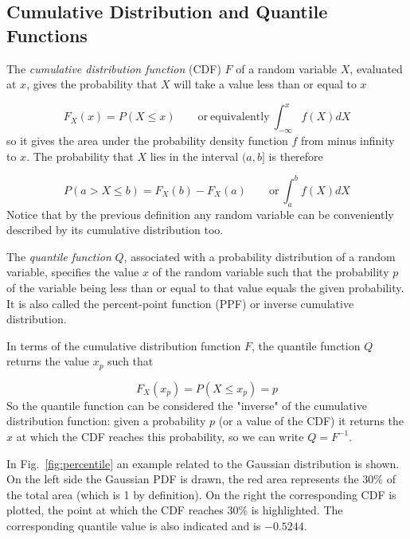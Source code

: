 \subsection{Cumulative Distribution and Quantile Functions}
\label{sec:quantile-function}

The \emph{cumulative distribution function} (CDF) $F$ of a random variable $X$, evaluated at $x$, gives the probability that $X$ will take a value less than or equal to $x$

\begin{equation}
F_X(x) = P(X \le x)\qquad\mathrm{or~equivalently}~\int_{-\infty}^{x}{f(X)dX}
\end{equation}
so it gives the area under the probability density function $f$ from minus infinity to $x$.
The probability that $X$ lies in the interval $(a,b]$ is therefore

\begin{equation}
P(a> X \le b)=F_{X}(b)-F_{X}(a)\qquad\mathrm{or}~\int_a^b{f(X)dX}
\end{equation}
Notice that by the previous definition any random variable can be conveniently described by its cumulative distribution too.

The \emph{quantile function} $Q$, associated with a probability distribution of a random variable, specifies the value $x$ of the random variable such that the probability $p$ of the variable being less than or equal to that value equals the given probability. It is also called the percent-point function (PPF) or inverse cumulative distribution.

In terms of the cumulative distribution function $F$, the quantile function $Q$ returns the value $x_p$ such that 

\begin{equation}
F_{X}(x_p)=P(X\le x_p)=p
\end{equation}
So the quantile function can be considered the "inverse" of the cumulative distribution function: given a probability $p$ (or a value of the CDF) it returns the $x$ at which the CDF reaches this probability, so we can write $Q=F^{-1}$.

In Fig.~\ref{fig:percentile} an example related to the Gaussian distribution is shown. On the left side the Gaussian PDF is drawn, the red area represents the 30\% of the total area (which is 1 by definition). On the right the corresponding CDF is plotted, the point at which the CDF reaches 30\% is highlighted. The corresponding quantile value is also indicated and is $-0.5244$.

